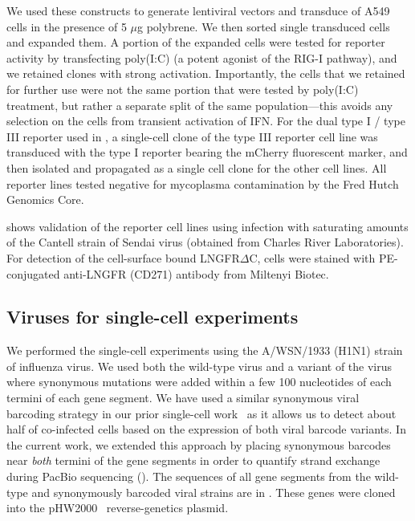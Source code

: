 \documentclass[9pt,lineno]{template}
\begin{document}
We used these constructs to generate lentiviral vectors and transduce of A549 cells in the presence of 5 $\mu$g polybrene.
We then sorted single transduced cells and expanded them.
A portion of the expanded cells were tested for reporter activity by transfecting poly(I:C) (a potent agonist of the RIG-I pathway), and we retained clones with strong activation.
Importantly, the cells that we retained for further use were not the same portion that were tested by poly(I:C) treatment, but rather a separate split of the same population---this avoids any selection on the cells from transient activation of IFN.
For the dual type I / type III reporter used in , a single-cell clone of the type III reporter cell line was transduced with the type I reporter bearing the mCherry fluorescent marker, and then isolated and propagated as a single cell clone for the other cell lines.
All reporter lines tested negative for mycoplasma contamination by the Fred Hutch Genomics Core.

 shows validation of the reporter cell lines using infection with saturating amounts of the Cantell strain of Sendai virus (obtained from Charles River Laboratories).
For detection of the cell-surface bound LNGFR$\Delta$C, cells were stained with PE-conjugated anti-LNGFR (CD271) antibody from Miltenyi Biotec.

\subsection{Viruses for single-cell experiments}
We performed the single-cell experiments using the A/WSN/1933 (H1N1) strain of influenza virus.
We used both the wild-type virus and a variant of the virus where synonymous mutations were added within a few 100 nucleotides of each termini of each gene segment.
We have used a similar synonymous viral barcoding strategy in our prior single-cell work~\citep{russell2018extreme} as it allows us to detect about half of co-infected cells based on the expression of both viral barcode variants.
In the current work, we extended this approach by placing synonymous barcodes near \emph{both} termini of the gene segments in order to quantify strand exchange during PacBio sequencing ().
The sequences of all gene segments from the wild-type and synonymously barcoded viral strains are in .
These genes were cloned into the pHW2000~\citep{hoffmann2000dna} reverse-genetics plasmid.
\end{document}
